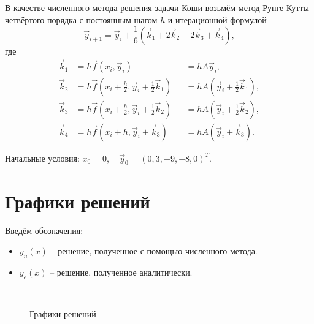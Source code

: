 \documentclass[a4paper,12pt]{article}
\begin{document}
В качестве численного метода решения задачи Коши возьмём метод Рунге-Кутты
четвёртого порядка с постоянным шагом $h$ и итерационной формулой
\begin{equation*}
    \vec{y}_{i+1} = \vec{y}_i + \frac{1}{6}
    \left(
        \vec{k}_1 + 2 \vec{k}_2 + 2 \vec{k}_3 + \vec{k}_4
    \right),
\end{equation*}
где
\begin{equation*}
    \begin{aligned}
        \vec{k}_1 &= h \vec{f}(x_i, \vec{y}_i) &&= h A \vec{y}_i, \\
        \vec{k}_2
            &= h \vec{f}(x_i + \frac{h}{2}, \vec{y}_i + \frac{1}{2}\vec{k}_1)
            &&= h A (\vec{y}_i + \frac{1}{2}\vec{k}_1), \\
        \vec{k}_3
            &= h \vec{f}(x_i + \frac{h}{2}, \vec{y}_i + \frac{1}{2}\vec{k}_2)
            &&= h A (\vec{y}_i + \frac{1}{2}\vec{k}_2), \\
        \vec{k}_4
            &= h \vec{f}(x_i + h, \vec{y}_i + \vec{k}_3)
            &&= h A (\vec{y}_i + \vec{k}_3).
    \end{aligned}
\end{equation*}

Начальные условия: $x_0 = 0, \quad \vec{y}_0 = (0, 3, -9, -8, 0)^T$.

\pagebreak

\section{Графики решений}

Введём обозначения:
\begin{itemize}
    \item $y_n(x)$ -- решение, полученное с помощью численного метода.
    \item $y_e(x)$ -- решение, полученное аналитически.
\end{itemize}

\begin{figure}[h]
    \centering
     \\
    \caption{Графики решений}
\end{figure}

\pagebreak


\end{document}

